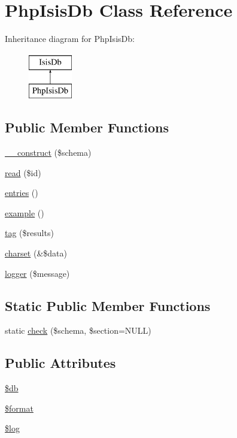 \hypertarget{classPhpIsisDb}{
\section{PhpIsisDb Class Reference}
\label{classPhpIsisDb}
}
Inheritance diagram for PhpIsisDb:\begin{figure}[H]
\begin{center}
\leavevmode
\includegraphics[height=2cm]{classPhpIsisDb}
\end{center}
\end{figure}
\subsection*{Public Member Functions}
\begin{DoxyCompactItemize}
\item 
\hyperlink{classPhpIsisDb_abb6db51373d065baf9135fd278653bc5}{\_\-\_\-construct} (\$schema)
\item 
\hyperlink{classPhpIsisDb_af2266931746f6f2335b831be8b8333fb}{read} (\$id)
\item 
\hyperlink{classPhpIsisDb_a0491ce84e5a85e775f811f18e63ef0fb}{entries} ()
\item 
\hyperlink{classPhpIsisDb_a7f4f3a9fd6dab86bd3cb3149d65f92cd}{example} ()
\item 
\hyperlink{classPhpIsisDb_a849f238c3323f53431be1c225a914d98}{tag} (\$results)
\item 
\hyperlink{classPhpIsisDb_a46f8c39b305f170e2cf8ae5f4d218e74}{charset} (\&\$data)
\item 
\hyperlink{classPhpIsisDb_a8d8185060a26d4fe673844b2ea3db39a}{logger} (\$message)
\end{DoxyCompactItemize}
\subsection*{Static Public Member Functions}
\begin{DoxyCompactItemize}
\item 
static \hyperlink{classPhpIsisDb_a23761cc04114090a2863467b2accc80a}{check} (\$schema, \$section=NULL)
\end{DoxyCompactItemize}
\subsection*{Public Attributes}
\begin{DoxyCompactItemize}
\item 
\hyperlink{classPhpIsisDb_a536e4c67dda71a7c7dad9ffbac299f9b}{\$db}
\item 
\hyperlink{classPhpIsisDb_a275e29f3711d37fc67cea340b564ddf3}{\$format}
\item 
\hyperlink{classPhpIsisDb_a0742105b3efab477fda99cd0561f98c7}{\$log}
\end{DoxyCompactItemize}


